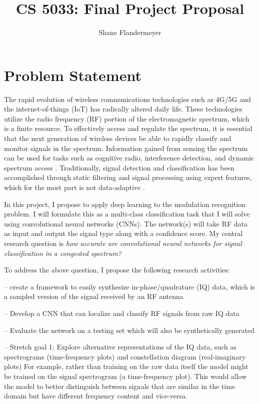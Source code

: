\documentclass{article}
\title{CS 5033: Final Project Proposal}
\author{Shane Flandermeyer}
\date{}
\begin{document}
\maketitle

\section{Problem Statement}
The rapid evolution of wireless communications technologies such as 4G/5G and the
internet-of-things (IoT) has radically altered daily life. These technologies
utilize the radio frequency (RF) portion of the electromagnetic spectrum,
which is a finite resource. To effectively access and regulate the spectrum, it
is essential that the next generation of wireless devices be able to rapidly
classify and monitor signals in the spectrum. Information gained from sensing the spectrum can
be used for tasks such as cognitive radio, interference detection, and dynamic
spectrum access \cite{Kulin2018}. Traditionally, signal detection and classification has been
accomplished through static filtering and signal processing using expert features, which for the
most part is not data-adaptive \cite{Ariananda2009}.

In this project, I propose to apply deep learning to the modulation recognition
problem. I will formulate this as a multi-class classification task that I will solve
using convolutional neural networks (CNNs). The network(s) will take RF data as
input and output the signal type along with a confidence score. My central research question is \textit{how
  accurate are convolutional neural networks for signal classification in a
  congested spectrum?}

To address the above question, I propose the following
research activities:

-- create a framework to easily synthesize in-phase/quadrature (IQ) data,
which is a sampled version of the signal received by an RF antenna

-- Develop a CNN that can localize and classify RF signals from raw IQ data

-- Evaluate the network on a testing set which will also be synthetically generated

-- Stretch goal 1: Explore alternative representations of the IQ data, such as
spectrograms (time-frequency plots) and constellation diagram (real-imaginary plots)
For example, rather than training on the raw data itself the model might be trained
on the signal spectrogram (a time-frequency plot). This would allow the
model to better distinguish between signals that are similar in the time domain
but have different frequency content and vice-versa.
\end{document}
